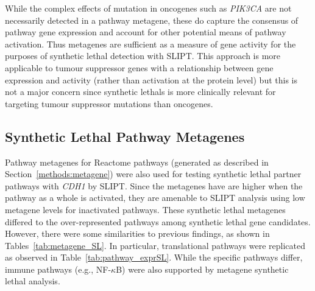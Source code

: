 While the complex effects of \gls{mutation} in \glspl{oncogene} such as \textit{PIK3CA} are not necessarily detected in a pathway \gls{metagene}, these do capture the consensus of pathway \gls{gene expression} and account for other potential means of pathway activation. Thus \glspl{metagene} are sufficient as a measure of gene activity for the purposes of \gls{synthetic lethal} detection with \gls{SLIPT}. This approach is more applicable to \gls{tumour suppressor} genes with a relationship between \gls{gene expression} and activity (rather than activation at the protein level) but this is not a major concern since \glspl{synthetic lethal} is more clinically relevant for targeting \gls{tumour suppressor} \glspl{mutation} than \glspl{oncogene}.
\fi


\FloatBarrier

\subsection{Synthetic Lethal Pathway Metagenes} \label{chapt3:metagene_SL}

Pathway \glspl{metagene} for Reactome pathways (generated as described in Section~\ref{methods:metagene}) were also used for testing \gls{synthetic lethal} partner pathways with \textit{CDH1} by \gls{SLIPT}. Since the \glspl{metagene} have are higher when the pathway as a whole is activated, they are amenable to \gls{SLIPT} analysis using low \gls{metagene} levels for inactivated pathways. These \gls{synthetic lethal} \glspl{metagene} differed to the over-represented pathways among \gls{synthetic lethal} gene candidates. However, there were some similarities to previous findings, as shown in Tables~\ref{tab:metagene_SL}. In particular, translational pathways were replicated as observed in Table~\ref{tab:pathway_exprSL}. While the specific pathways differ, immune pathways (e.g., NF-$\kappa$B) were also supported by \gls{metagene} \gls{synthetic lethal} analysis.

